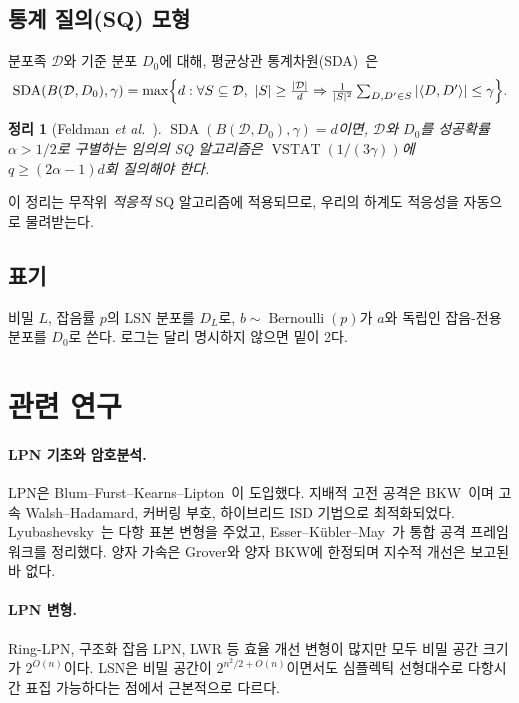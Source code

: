 \documentclass[11pt,a4paper]{article}
\theoremstyle{plain}
\newtheorem{theorem}{정리}[section]
\theoremstyle{definition}
\DeclareMathOperator{\SDA}{SDA}
\DeclareMathOperator{\VSTAT}{VSTAT}
\newcommand{\etal}{\textit{et al.}}
\begin{document}
\subsection{통계 질의(SQ) 모형}

분포족 $\mathcal{D}$와 기준 분포 $D_0$에 대해, 평균상관 통계차원(SDA)~\cite{FGR+17}은
\[
\SDA(B(\mathcal{D},D_0),\gamma) = \max\Bigl\{d : \forall S \subseteq \mathcal{D},\ |S| \ge \tfrac{|\mathcal{D}|}{d} \Rightarrow \tfrac{1}{|S|^2}\textstyle\sum_{D,D' \in S}|\langle D,D'\rangle| \le \gamma\Bigr\}.
\]

\begin{theorem}[Feldman \etal~\cite{FGR+17}]
$\SDA(B(\mathcal{D},D_0),\gamma) = d$이면, $\mathcal{D}$와 $D_0$를 성공확률 $\alpha > 1/2$로 구별하는 임의의 SQ 알고리즘은 $\VSTAT(1/(3\gamma))$에 $q \ge (2\alpha-1)d$회 질의해야 한다.
\end{theorem}

이 정리는 무작위 \emph{적응적} SQ 알고리즘에 적용되므로, 우리의 하계도 적응성을 자동으로 물려받는다.

\subsection{표기}

비밀 $L$, 잡음률 $p$의 LSN 분포를 $D_L$로, $b \sim \operatorname{Bernoulli}(p)$가 $a$와 독립인 잡음-전용 분포를 $D_0$로 쓴다. 로그는 달리 명시하지 않으면 밑이 2다.

\section{관련 연구}

\paragraph{LPN 기초와 암호분석.} LPN은 Blum--Furst--Kearns--Lipton~\cite{BFKL94}이 도입했다. 지배적 고전 공격은 BKW~\cite{BKW03}이며 고속 Walsh--Hadamard, 커버링 부호, 하이브리드 ISD 기법으로 최적화되었다. Lyubashevsky~\cite{Lyu05}는 다항 표본 변형을 주었고, Esser--K\"ubler--May~\cite{EKM17}가 통합 공격 프레임워크를 정리했다. 양자 가속은 Grover와 양자 BKW에 한정되며 지수적 개선은 보고된 바 없다.

\paragraph{LPN 변형.} Ring-LPN, 구조화 잡음 LPN, LWR 등 효율 개선 변형이 많지만 모두 비밀 공간 크기가 $2^{O(n)}$이다. LSN은 비밀 공간이 $2^{n^2/2+O(n)}$이면서도 심플렉틱 선형대수로 다항시간 표집 가능하다는 점에서 근본적으로 다르다.
\end{document}
